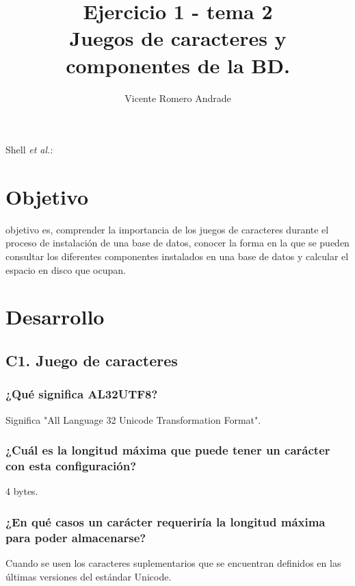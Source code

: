 \documentclass[journal]{IEEEtran}
\begin{document}
\title{Ejercicio 1 - tema 2 \\ Juegos de caracteres y componentes de la BD.}
%
\author{Vicente Romero Andrade}

%
{Shell \MakeLowercase{\textit{et al.}}: }

\maketitle


\IEEEpeerreviewmaketitle

\section{Objetivo}

 objetivo es, comprender la importancia de los juegos de caracteres durante el proceso de instalación de una base de datos, conocer la forma en la que se 
pueden consultar los diferentes componentes instalados en una base de datos y calcular el espacio en disco que ocupan.


\section{Desarrollo}
\subsection{C1. Juego de caracteres}
\subsubsection{¿Qué significa AL32UTF8?}
Significa "All Language 32 Unicode Transformation Format".
\subsubsection{¿Cuál es la longitud máxima que puede tener un carácter con esta configuración?}
4 bytes.
\subsubsection{¿En qué casos un carácter requeriría la longitud máxima para poder almacenarse?}
Cuando se usen los caracteres suplementarios que se encuentran definidos en las últimas versiones
del estándar Unicode.
\end{document}
